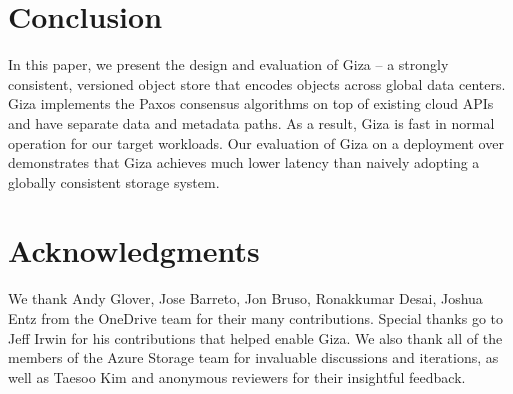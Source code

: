 \section{Conclusion}

In this paper, we present the design and evaluation of Giza -- a strongly
consistent, versioned object store that encodes objects across global data
centers. Giza implements the Paxos consensus algorithms on top of existing cloud
APIs and have separate data and metadata paths. As a result, Giza is fast in
normal operation for our target workloads. Our evaluation of Giza on a
deployment over \deployment demonstrates that Giza achieves much lower latency
than naively adopting a globally consistent storage system.

\section{Acknowledgments}

We thank Andy Glover, Jose Barreto, Jon Bruso, Ronakkumar Desai, Joshua Entz from the OneDrive team for their many contributions.
Special thanks go to Jeff Irwin for his contributions that helped enable Giza.
We also thank all of the members of the Azure Storage team for invaluable discussions and iterations,
as well as Taesoo Kim and anonymous reviewers for their insightful feedback.
